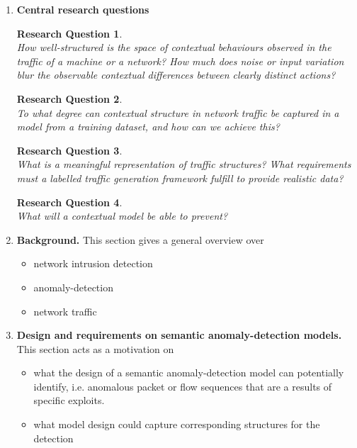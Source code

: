 \documentclass[a4paper,12pt,twoside]{article}
\newtheorem{rquestion}{Research Question}
\begin{document}
\begin{enumerate}
\item \textbf{Central research questions}
\begin{rquestion}\ \\ 
How well-structured is the space of contextual behaviours observed in the traffic of a machine or a network? How much does noise or input variation blur the observable contextual differences between clearly distinct actions?
\end{rquestion}


\begin{rquestion}\ \\
To what degree can contextual structure in network traffic be captured in a model from a training dataset, and how can we achieve this?
\end{rquestion}


\begin{rquestion}\ \\
What is a meaningful representation of traffic structures? What requirements must a labelled traffic generation framework fulfill to provide realistic data?
\end{rquestion}


\begin{rquestion}\ \\
What will a contextual model be able to prevent?
\end{rquestion}


\item \textbf{Background.}
This section gives a general overview over 
 \begin{itemize}
 \item network intrusion detection
 \item anomaly-detection
 \item network traffic
 \end{itemize}

\item \textbf{Design and requirements on semantic anomaly-detection models.}
This section acts as a motivation on 
 \begin{itemize}
 \item what the design of a semantic anomaly-detection model can potentially identify, i.e. anomalous packet or flow sequences that are a results of specific exploits. 
 \item what model design could capture corresponding structures for the detection
 \end{itemize}


\end{enumerate}
\end{document}
